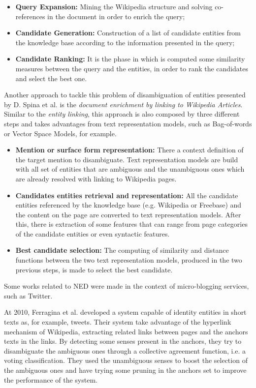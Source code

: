 \begin{itemize}
\item \textbf{Query Expansion:} Mining the Wikipedia structure and solving co-references in the document in order to enrich the query;
\item \textbf{Candidate Generation:} Construction of a list of candidate entities from the knowledge base according to the information presented in the query;
\item \textbf{Candidate Ranking:} It is the phase in which is computed some similarity measures between the query and the entities, in order to rank the candidates and select the best one.
\end{itemize}

Another approach to tackle this problem of disambiguation of entities presented by D. Spina et al. \cite{Spina2013} is the \textit{document enrichment by linking to Wikipedia Articles}. Similar to the \textit{entity linking}, this approach is also composed by three different steps and takes advantages from text representation models, such as Bag-of-words or Vector Space Models, for example.

\begin{itemize}
\item \textbf{Mention or surface form representation:} There a context definition of the target mention to disambiguate. Text representation models are build with all set of entities that are ambiguous and the unambiguous ones which are already resolved with linking to Wikipedia pages.  
\item \textbf{Candidates entities retrieval and representation:} All the candidate entities referenced by the knowledge base (e.g. Wikipedia or Freebase) and the content on the page are converted to text representation models. After this, there is extraction of some features that can range from page categories of the candidate entities or even syntactic features.
\item \textbf{Best candidate selection:} The computing of similarity and distance functions between the two text representation models, produced in the two previous steps, is made to select the best candidate. 
\end{itemize}

Some works related to NED were made in the context of micro-blogging services, such as Twitter.

At 2010, Ferragina et al. \cite{kn:Ferragina2010} developed a system capable of identity entities in short texts as, for example, tweets. Their system take advantage of the hyperlink mechanism of Wikipedia, extracting related links between pages and the anchors texts in the links. By detecting some senses present in the anchors, they try to disambiguate the ambiguous ones through a collective agreement function, i.e. a voting classification. They used the unambiguous senses to boost the selection of the ambiguous ones and have trying some pruning in the anchors set to improve the performance of the system.

